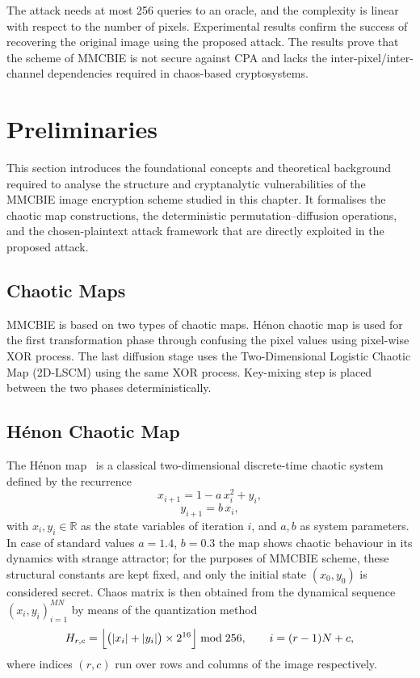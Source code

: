 The attack needs at most 256 queries to an oracle, and the complexity is linear with respect to the number of pixels. Experimental results confirm the success of recovering the original image using the proposed attack. The results prove that the scheme of MMCBIE is not secure against CPA and lacks the inter-pixel/inter-channel dependencies required in chaos-based cryptosystems.

\section{Preliminaries}
\label{sec:lad-prelim}
This section introduces the foundational concepts and theoretical background required to analyse the structure and cryptanalytic vulnerabilities of the MMCBIE image encryption scheme studied in this chapter. It formalises the chaotic map constructions, the deterministic permutation–diffusion operations, and the chosen-plaintext attack framework that are directly exploited in the proposed attack.

\subsection{Chaotic Maps}

MMCBIE is based on two types of chaotic maps.
H\'enon chaotic map is used for the first transformation phase 
through confusing the pixel values using pixel-wise XOR process.
The last diffusion stage uses the Two-Dimensional Logistic Chaotic
Map (2D-LSCM) using the same XOR process. 
Key-mixing step is placed between the two phases deterministically.

\subsection{H\'enon Chaotic Map}

The H\'enon map~\cite{henon1976map} is a classical two-dimensional
discrete-time chaotic system defined by the recurrence
\begin{equation}
    x_{i+1} = 1 - a\,x_i^2 + y_i,
    \label{eq:henon_x}
\end{equation}
\begin{equation}
    y_{i+1} = b\,x_i,
    \label{eq:henon_y}
\end{equation}
with $x_i, y_i \in \mathbb{R}$ as the state variables of iteration
$i$, and $a,b$ as system parameters.
In case of standard values $a = 1.4$, $b = 0.3$ the map shows
chaotic behaviour in its dynamics with strange attractor;
for the purposes of MMCBIE scheme, these structural constants are kept fixed,
and only the initial state $(x_0,y_0)$ is considered secret.
Chaos matrix is then obtained from the dynamical sequence
$(x_i, y_i)_{i=1}^{MN}$ by means of the quantization method
\begin{equation}
    H_{r,c}
    = \Bigl\lfloor
        \bigl(\lvert x_i \rvert + \lvert y_i \rvert\bigr)
        \times 2^{16}
      \Bigr\rfloor \bmod 256,
    \qquad i = (r-1)N + c,
    \label{eq:henon_quant}
\end{equation}
where indices $(r,c)$ run over rows and columns of the image
respectively.

